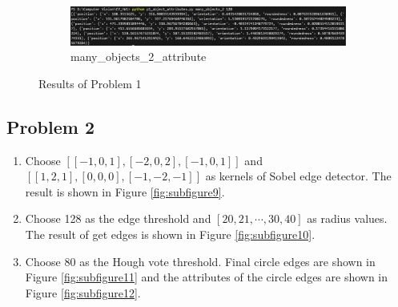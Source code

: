 \documentclass[bwprint]{gmcmthesis}
\numberwithin{figure}{section}
\begin{document}
\begin{enumerate}[label=\alph*.]
\begin{figure}[h]
\begin{subfigure}[b]{\textwidth}
            \centering
            \includegraphics[width=\textwidth]{../output/many_objects_2_attribute.png}
            \caption{many\_objects\_2\_attribute}
            \label{fig:subfigure8}
        \end{subfigure}
    \caption{Results of Problem 1}
    \end{figure}
\end{enumerate}

\subsection{Problem 2}
\begin{enumerate}[label=\alph*.]
    \item Choose $[[-1, 0, 1], [-2, 0, 2], [-1, 0, 1]]$ and $[[1, 2, 1], [0, 0, 0], [-1, -2, -1]]$ as kernels of Sobel edge detector. The result is shown in Figure \ref{fig:subfigure9}.
    \item Choose 128 as the edge threshold and $[20, 21, \cdots, 30, 40]$ as radius values. The result of get edges is shown in Figure \ref{fig:subfigure10}.
    \item Choose 80 as the Hough vote threshold. Final circle edges are shown in Figure \ref{fig:subfigure11} and the attributes of the circle edges are shown in Figure \ref{fig:subfigure12}.
\end{enumerate}
\end{document}
